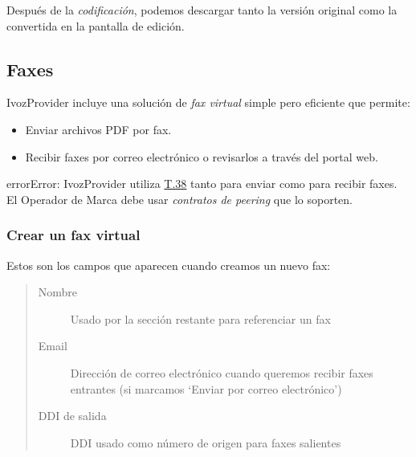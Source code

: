 \documentclass[letterpaper,10pt,spanish]{sphinxmanual}
\begin{document}
Después de la \emph{codificación}, podemos descargar tanto la versión original como la convertida en la pantalla de edición.
\label{administration_portal/client/vpbx/faxes:faxing-system}

\subsection{Faxes}
\label{administration_portal/client/vpbx/faxes:faxes}\label{administration_portal/client/vpbx/faxes::doc}\label{administration_portal/client/vpbx/faxes:faxing-system}\label{administration_portal/client/vpbx/faxes:id1}
IvozProvider incluye una solución de \emph{fax virtual} simple pero eficiente que permite:
\begin{itemize}
\item {} 
Enviar archivos PDF por fax.

\item {} 
Recibir faxes por correo electrónico o revisarlos a través del portal web.

\end{itemize}

\begin{notice}{error}{Error:}
IvozProvider utiliza \href{http://www.voip-info.org/wiki/view/T.38}{T.38} tanto para enviar como para recibir faxes. El Operador de Marca debe usar \emph{contratos de peering} que lo soporten.
\end{notice}


\subsubsection{Crear un fax virtual}
\label{administration_portal/client/vpbx/faxes:creating-a-virtual-fax}
Estos son los campos que aparecen cuando creamos un nuevo fax:
\begin{quote}
\begin{description}
\item[{Nombre}] \leavevmode
Usado por la sección restante para referenciar un fax

\item[{Email}] \leavevmode
Dirección de correo electrónico cuando queremos recibir faxes entrantes (si marcamos `Enviar por correo electrónico')

\item[{DDI de salida}] \leavevmode
DDI usado como número de origen para faxes salientes

\end{description}
\end{quote}
\end{document}
